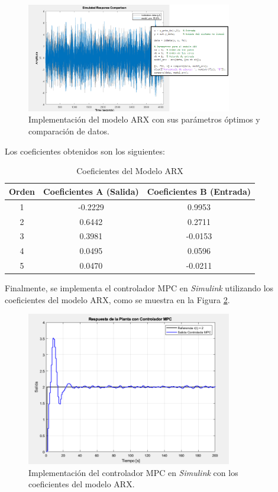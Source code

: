 \begin{enumerate}
    \begin{figure}
        \centering
        \includegraphics[width=0.8\textwidth]{img/Figure_11}
        \caption{Implementación del modelo ARX con sus parámetros óptimos y comparación de datos.}
        \label{fig:11}
    \end{figure}
    
    Los coeficientes obtenidos son los siguientes:
    
    \begin{table}[h]
        \centering
        \caption{Coeficientes del Modelo ARX}
        \begin{tabular}{|c|c|c|}
        \hline
        \textbf{Orden} & \textbf{Coeficientes A (Salida)} & \textbf{Coeficientes B (Entrada)} \\ \hline
        1 & -0.2229 & 0.9953 \\ \hline
        2 & 0.6442  & 0.2711 \\ \hline
        3 & 0.3981  & -0.0153 \\ \hline
        4 & 0.0495  & 0.0596 \\ \hline
        5 & 0.0470  & -0.0211 \\ \hline
        \end{tabular}
    \end{table}
    
    Finalmente, se implementa el controlador MPC en \textit{Simulink} utilizando los coeficientes del modelo ARX, como se muestra en la Figura \ref{fig:12}.
    
    \begin{figure}
        \centering
        \includegraphics[width=0.8\textwidth]{img/Figure_12}
        \caption{Implementación del controlador MPC en \textit{Simulink} con los coeficientes del modelo ARX.}
        \label{fig:12}
    \end{figure}
    

\end{enumerate}
